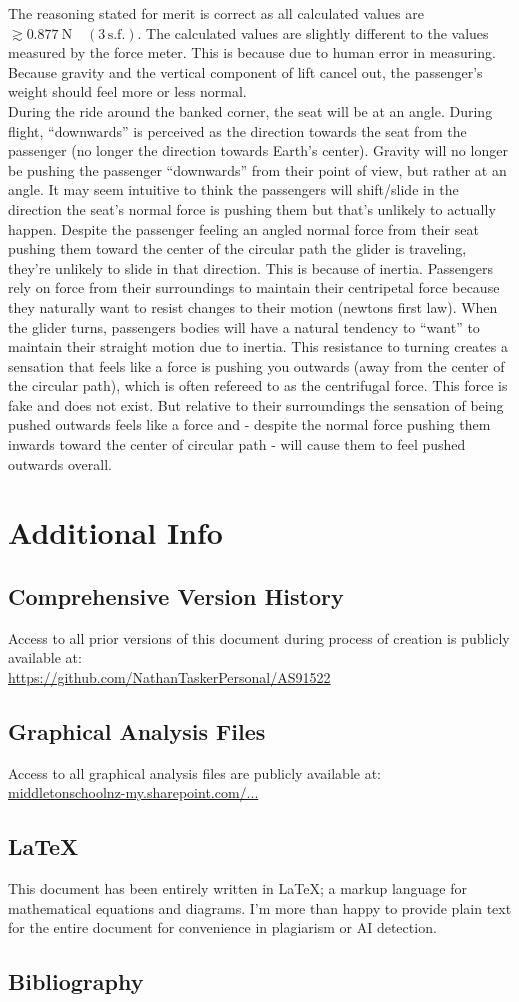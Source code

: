 \documentclass[11pt, a4paper]{article}
\def\ParagraphSpacing{30pt}
\begin{document}
	The reasoning stated for merit is correct as all calculated values are $\gtrsim\SI{0.877}{\newton} \quad (3\, \text{s.f.})$. The calculated values are slightly different to the values measured by the force meter. This is because due to human error in measuring.\\[\ParagraphSpacing]
	Because gravity and the vertical component of lift cancel out, the passenger's weight should feel more or less normal.\\
	During the ride around the banked corner, the seat will be at an angle. During flight, ``downwards'' is perceived as the direction towards the seat from the passenger (no longer the direction towards Earth's center). Gravity will no longer be pushing the passenger ``downwards'' from their point of view, but rather at an angle. It may seem intuitive to think the passengers will shift/slide in the direction the seat's normal force is pushing them but that's unlikely to actually happen. Despite the passenger feeling an angled normal force from their seat pushing them toward the center of the circular path the glider is traveling, they're unlikely to slide in that direction. This is because of inertia. Passengers rely on force from their surroundings to maintain their centripetal force because they naturally want to resist changes to their motion (newtons first law). When the glider turns, passengers bodies will have a natural tendency to ``want'' to maintain their straight motion due to inertia. This resistance to turning creates a sensation that feels like a force is pushing you outwards (away from the center of the circular path), which is often refereed to as the centrifugal force. This force is fake and does not exist. But relative to their surroundings the sensation of being pushed outwards feels like a force and - despite the normal force pushing them inwards toward the center of circular path - will cause them to feel pushed outwards overall.
	
	\section{Additional Info}
	\subsection{Comprehensive Version History}
	Access to all prior versions of this document during process of creation is publicly available at:\\
	\url{https://github.com/NathanTaskerPersonal/AS91522}
	\subsection{Graphical Analysis Files}
	Access to all graphical analysis files are publicly available at:\\
	\href{https://middletonschoolnz-my.sharepoint.com/:f:/g/personal/taskern_middleton_school_nz/EhEmw21C2L9Fn9BYUy2ccwMBn6xCUF93vtfvtT_5_rkxbA?e=Tp02lP}{middletonschoolnz-my.sharepoint.com/...}
	\subsection{\LaTeX}
	This document has been entirely written in \LaTeX; a markup language for mathematical equations and diagrams. I'm more than happy to provide plain text for the entire document for convenience in plagiarism or AI detection.
	\subsection{Bibliography}
\end{document}
